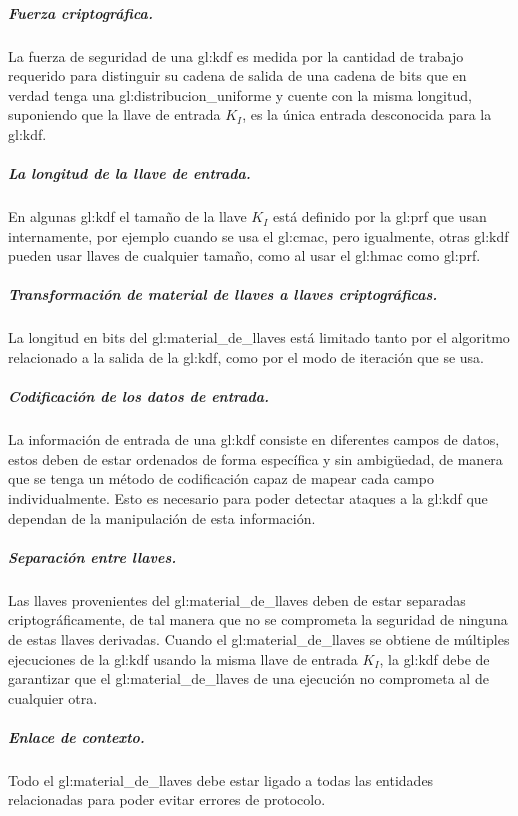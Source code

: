 \subparagraph{Fuerza criptográfica.}
La fuerza de seguridad de una \gls{gl:kdf} es medida por la cantidad de 
trabajo requerido para distinguir su cadena de salida de una cadena de bits 
que en verdad tenga una \gls{gl:distribucion_uniforme} y cuente con la misma 
longitud, suponiendo que la llave de entrada $K_I$, es la única entrada 
desconocida para la \gls{gl:kdf}.

\subparagraph{La longitud de la llave de entrada.}
En algunas \gls{gl:kdf} el tamaño de la llave $K_I$ está definido por la 
\gls{gl:prf} que usan internamente, por ejemplo cuando se usa el \gls{gl:cmac}, 
pero igualmente, otras \gls{gl:kdf} pueden usar llaves de cualquier tamaño, 
como al usar el \gls{gl:hmac} como \gls{gl:prf}.

\subparagraph{Transformación de material de llaves a llaves criptográficas.}
La longitud en bits del \gls{gl:material_de_llaves} está limitado tanto por 
el algoritmo relacionado a la salida de la \gls{gl:kdf}, como por el modo de 
iteración que se usa.

\subparagraph{Codificación de los datos de entrada.}
La información de entrada de una \gls{gl:kdf} consiste en diferentes campos 
de datos, estos deben de estar ordenados de forma específica y sin ambigüedad, 
de manera que se tenga un método de codificación capaz de mapear cada campo 
individualmente. Esto es necesario para poder detectar ataques a la 
\gls{gl:kdf} que dependan de la manipulación de esta información.

\subparagraph{Separación entre llaves.}
Las llaves provenientes del \gls{gl:material_de_llaves} deben de estar 
separadas criptográficamente, de tal manera que no se comprometa la seguridad 
de ninguna de estas llaves derivadas. Cuando el \gls{gl:material_de_llaves} 
se obtiene de múltiples ejecuciones de la \gls{gl:kdf} usando la misma llave 
de entrada $K_I$, la \gls{gl:kdf} debe de garantizar que el 
\gls{gl:material_de_llaves} de una ejecución no comprometa al de cualquier 
otra.

\subparagraph{Enlace de contexto.}
Todo el \gls{gl:material_de_llaves} debe estar ligado a todas las entidades 
relacionadas para poder evitar errores de protocolo.

